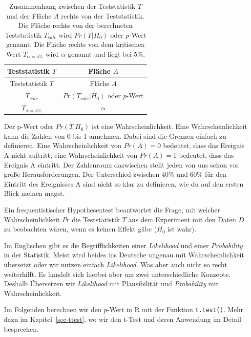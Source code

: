\documentclass[
  letterpaper,
  DIV=11,
  oneside]{scrreport}
\begin{document}
\hypertarget{tbl-t-und-A}{}
\begin{longtable}[]{@{}cc@{}}
\caption{\label{tbl-t-und-A}Zusammenhang zwischen der Teststatistik
\(T\) und der Fläche \(A\) rechts von der Teststatistik. Die Fläche
rechts von der berechneten Teststatistik \(T_{calc}\) wird \(Pr(T|H_0)\)
oder \(p\)-Wert genannt. Die Fläche rechts von dem kritischen Wert
\(T_{\alpha = 5\%}\) wird \(\alpha\) genannt und liegt bei
5\%.}\tabularnewline
\toprule()
Teststatistik \(T\) & Fläche \(A\) \\
\midrule()
\endfirsthead
\toprule()
Teststatistik \(T\) & Fläche \(A\) \\
\midrule()
\endhead
\(T_{calc}\) & \(Pr(T_{calc}|H_0)\) oder \(p\)-Wert \\
\(T_{\alpha = 5\%}\) & \(\alpha\) \\
\bottomrule()
\end{longtable}

Der p-Wert oder \(Pr(T|H_0)\) ist eine Wahrscheinlichkeit. Eine
Wahrscheinlichkeit kann die Zahlen von 0 bis 1 annehmen. Dabei sind die
Grenzen einfach zu definieren. Eine Wahrscheinlichkeit von \(Pr(A) = 0\)
bedeutet, dass das Ereignis A nicht auftritt; eine Wahrscheinlichkeit
von \(Pr(A) = 1\) bedeutet, dass das Ereignis A eintritt. Der Zahlenraum
dazwischen stellt jeden von uns schon vor große Herausforderungen. Der
Unterschied zwischen 40\% und 60\% für den Eintritt des Ereignisses A
sind nicht so klar zu definieren, wie du auf den ersten Blick meinen
magst.

Ein frequentistischer Hypothesentest beantwortet die Frage, mit welcher
Wahrscheinlichkeit \(Pr\) die Teststatistik \(T\) aus dem Experiment mit
den Daten \(D\) zu beobachten wären, wenn es keinen Effekt gäbe (\(H_0\)
ist wahr).

{}

Im Englischen gibt es die Begrifflichkeiten einer \emph{Likelihood} und
einer \emph{Probability} in der Statistik. Meist wird beides ins
Deutsche ungenau mit Wahrscheinlichkeit übersetzt oder wir nutzen
einfach \emph{Likelihood}. Was aber auch nicht so recht weiterhilft. Es
handelt sich hierbei aber um zwei unterschiedliche Konzepte. Deshalb
Übersetzen wir \emph{Likelihood} mit Plausibilität und
\emph{Probability} mit Wahrscheinlichkeit.

Im Folgenden berechnen wir den \(p\)-Wert in R mit der Funktion
\texttt{t.test()}. Mehr dazu im Kapitel~\ref{sec-ttest}, wo wir den
t-Test und deren Anwendung im Detail besprechen.
\end{document}
